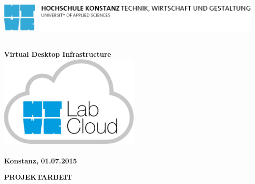 \begin{titlepage}

\vspace*{-3.5cm}

\begin{flushleft}
\hspace*{-1cm} \includegraphics[width=15.7cm]{include/htwg-logo.pdf}
\end{flushleft}

\vspace{2cm}

\begin{center}
	\huge{
		\textbf{\thema} \\[0.3cm]
	}
	\large{
		\textbf{Virtual Desktop Infrastructure} \\[2cm]
	}
	\includegraphics[width=7cm]{img/logo.png} \\[5cm]
	\Large{
		\textbf{\studiengang}
	}\\[3cm]
	\large{
		\textbf{Konstanz, 01.07.2015} \\[2.3cm]
	}
	
	\Huge{
		\textbf{{\sf PROJEKTARBEIT}}
	}
\end{center}

\end{titlepage}